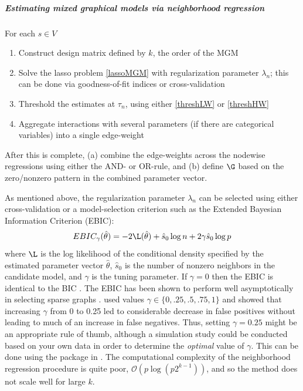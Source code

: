 \subparagraph{Estimating mixed graphical models via neighborhood regression}
For each $s \in V$
\begin{enumerate}
    \item Construct design matrix defined by $k$, the order of the MGM
    \item Solve the lasso problem \eqref{lassoMGM} with regularization parameter $\lambda_n$; this can be done via goodness-of-fit indices or cross-validation
    \item Threshold the estimates at $\tau_n$, using either \eqref{threshLW} or \eqref{threshHW}
    \item Aggregate interactions with several parameters (if there are categorical variables) into a single edge-weight
\end{enumerate}
After this is complete, (a) combine the edge-weights across the nodewise regressions using either the AND- or OR-rule, and (b) define $\G$ based on the zero/nonzero pattern in the combined parameter vector.

As mentioned above, the regularization parameter $\lambda_n$ can be selected using either cross-validation or a model-selection criterion such as the Extended Bayesian Information Criterion (EBIC):
\begin{equation} \label{ebic}
    EBIC_{\gamma} (\hat{\theta}) = -2\L(\hat{\theta}) + \hat{s}_0 \log n + 2 \gamma \hat{s}_0 \log p
\end{equation}
where $\L$ is the log likelihood of the conditional density specified by the estimated parameter vector $\hat{\theta}$, $\hat{s}_0$ is the number of nonzero neighbors in the candidate model, and $\gamma$ is the tuning parameter. If $\gamma = 0$ then the EBIC is identical to the BIC \cite{schwarz1978estimating}. The EBIC has been shown to perform well asymptotically in selecting sparse graphs \cite{foygel2010extended,foygel2015high}. \cite{foygel2010extended} used values $\gamma \in \{0,.25,.5,.75,1\}$ and showed that increasing $\gamma$ from 0 to 0.25 led to considerable decrease in false positives without leading to much of an increase in false negatives. Thus, setting $\gamma = 0.25$ might be an appropriate rule of thumb, although a simulation study could be conducted based on your own data in order to determine the \textit{optimal} value of $\gamma$. This can be done using the  package in  \cite{haslbeck2015mgm}. The computational complexity of the neighborhood regression procedure is quite poor, $\mathcal{O}(p\log(p2^{k-1}))$, and so the method does not scale well for large $k$.

